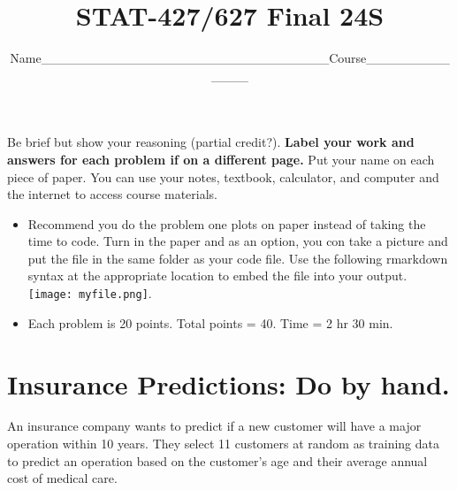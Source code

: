 \documentclass[
  letterpaper,
  DIV=11,
  numbers=noendperiod]{scrartcl}
\title{STAT-427/627 Final 24S}
\subtitle{Name\_\_\_\_\_\_\_\_\_\_\_\_\_\_\_\_\_\_\_\_\_\_\_\_\_\_\_\_\_\_\_Course\_\_\_\_\_\_\_\_\_\_\_\_\_}
\author{}
\date{}
\begin{document}
\maketitle

Be brief but show your reasoning (partial credit?). \textbf{Label your
work and answers for each problem if on a different page.} Put your name
on each piece of paper. You can use your notes, textbook, calculator,
and computer and the internet to access course materials.

\begin{itemize}
\item
  Recommend you do the problem one plots on paper instead of taking the
  time to code. Turn in the paper and as an option, you con take a
  picture and put the file in the same folder as your code file. Use the
  following rmarkdown syntax at the appropriate location to embed the
  file into your output. \texttt{[image: myfile.png]}.
\item
  Each problem is 20 points. Total points = 40. Time = 2 hr 30 min.
\end{itemize}

\section{Insurance Predictions: Do by
hand.}\label{insurance-predictions-do-by-hand.}

An insurance company wants to predict if a new customer will have a
major operation within 10 years. They select 11 customers at random as
training data to predict an operation based on the customer's age and
their average annual cost of medical care.
\end{document}
